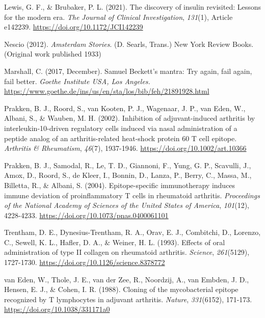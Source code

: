 \documentclass[authordate, editorial, issue]{jote-new-article}
\begin{document}
	Lewis, G. F., \& Brubaker, P. L. (2021). The discovery of insulin revisited: Lessons for the modern era. \emph{The} \emph{Journal of Clinical Investigation},\emph{ 131}(1), Article e142239. \url{https://doi.org/10.1172/JCI142239}



	Nescio (2012). \emph{Amsterdam Stories}. (D. Searls, Trans.) New York Review Books. (Original work published 1933)



	Marshall, C. (2017, December). Samuel Beckett's mantra: Try again, fail again, fail better. \emph{Goethe Institute USA, Los Angeles.} \url{https://www.goethe.de/ins/us/en/sta/los/bib/feh/21891928.html}



	Prakken, B. J., Roord, S., van Kooten, P. J., Wagenaar, J. P., van Eden, W., Albani, S., \& Wauben, M. H. (2002). Inhibition of adjuvant-induced arthritis by interleukin-10-driven regulatory cells induced via nasal administration of a peptide analog of an arthritis-related heat-shock protein 60 T cell epitope. \emph{Arthritis \& Rheumatism},\emph{ 46}(7), 1937-1946. \url{https://doi.org/10.1002/art.10366}



	Prakken, B. J., Samodal, R., Le, T. D., Giannoni, F., Yung, G. P., Scavulli, J., Amox, D., Roord, S., de Kleer, I., Bonnin, D., Lanza, P., Berry, C., Massa, M., Billetta, R., \& Albani, S. (2004). Epitope-specific immunotherapy induces immune deviation of proinflammatory T cells in rheumatoid arthritis. \emph{Proceedings of the National Academy of Sciences of the United States of America},\emph{ 101}(12), 4228-4233. \url{https://doi.org/10.1073/pnas.0400061101}



	Trentham, D. E., Dynesius-Trentham, R. A., Orav, E. J., Combitchi, D., Lorenzo, C., Sewell, K. L., Hafler, D. A., \& Weiner, H. L. (1993). Effects of oral administration of type II collagen on rheumatoid arthritis. \emph{Science},\emph{ 261}(5129), 1727-1730. \url{https://doi.org/10.1126/science.8378772}



	van Eden, W., Thole, J. E., van der Zee, R., Noordzij, A., van Embden, J. D., Hensen, E. J., \& Cohen, I. R. (1988). Cloning of the mycobacterial epitope recognized by T lymphocytes in adjuvant arthritis. \emph{Nature},\emph{ 331}(6152), 171-173. \url{https://doi.org/10.1038/331171a0}
\end{document}
